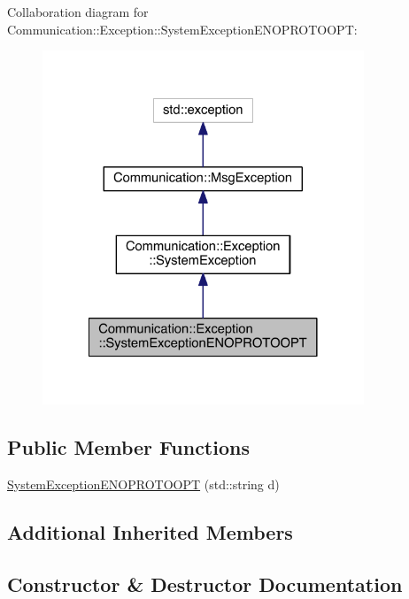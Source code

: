 Collaboration diagram for Communication\+:\+:Exception\+:\+:System\+Exception\+E\+N\+O\+P\+R\+O\+T\+O\+O\+P\+T\+:\nopagebreak
\begin{figure}[H]
\begin{center}
\leavevmode
\includegraphics[width=272pt]{class_communication_1_1_exception_1_1_system_exception_e_n_o_p_r_o_t_o_o_p_t__coll__graph}
\end{center}
\end{figure}
\subsection*{Public Member Functions}
\begin{DoxyCompactItemize}
\item 
\hyperlink{class_communication_1_1_exception_1_1_system_exception_e_n_o_p_r_o_t_o_o_p_t_aaae77d59f01b9ebb733799f532658352}{System\+Exception\+E\+N\+O\+P\+R\+O\+T\+O\+O\+P\+T} (std\+::string d)
\end{DoxyCompactItemize}
\subsection*{Additional Inherited Members}


\subsection{Constructor \& Destructor Documentation}
\hypertarget{class_communication_1_1_exception_1_1_system_exception_e_n_o_p_r_o_t_o_o_p_t_aaae77d59f01b9ebb733799f532658352}{}
